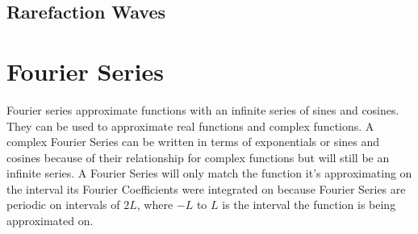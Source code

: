 \documentclass{article}
\newcommand{\blue}[1]{\textcolor{blue}{#1}}
\begin{document}
\subsection{Rarefaction Waves}

\section{Fourier Series}
Fourier series approximate functions with an infinite series of sines and cosines. They can be used to approximate real functions and complex functions. A complex Fourier Series can be written in terms of exponentials or sines and cosines because of their relationship for complex functions but will still be an infinite series. \newline
A Fourier Series will only match the function it's approximating on the interval its Fourier Coefficients were integrated on because Fourier Series are periodic on intervals of $2L$, where $-L$ to $L$ is the interval the function is being approximated on. 
\end{document}
